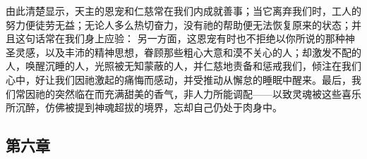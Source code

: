\par

由此清楚显示，天主的恩宠和仁慈常在我们内成就善事；当它离弃我们时，工人的努力便徒劳无益；无论人多么热切奋力，没有祂的帮助便无法恢复原来的状态；并且这句话常在我们身上应验：\newline{} 另一方面，这恩宠有时也不拒绝以你所说的那种神圣灵感，以及丰沛的精神思想，眷顾那些粗心大意和漠不关心的人；却激发不配的人，唤醒沉睡的人，光照被无知蒙蔽的人，并仁慈地责备和惩戒我们，倾注在我们心中，好让我们因祂激起的痛悔而感动，并受推动从懈怠的睡眠中醒来。最后，我们常因祂的突然临在而充满甜美的香气，非人力所能调配——以致灵魂被这些喜乐所沉醉，仿佛被提到神魂超拔的境界，忘却自己仍处于肉身中。\par


\subsection{第六章}

\par

